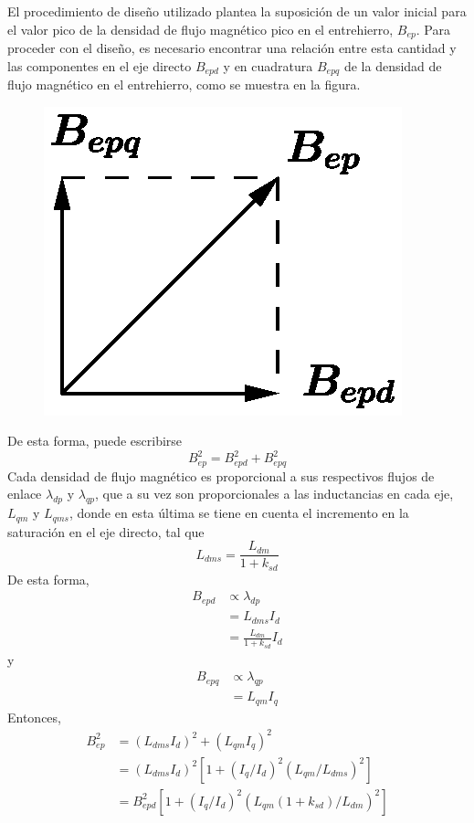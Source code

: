 El procedimiento de diseño utilizado plantea la suposición de un valor inicial para el valor pico de la densidad de flujo magnético pico en el entrehierro, $B_{ep}$. Para proceder con el diseño, es necesario encontrar una relación entre esta cantidad y las componentes en el eje directo $B_{epd}$ y en cuadratura $B_{epq}$ de la densidad de flujo magnético en el entrehierro, como se muestra en la figura.
\begin{figure}
\centering
\includegraphics[scale=0.5]{../img/Teoria_del_MLR/B_decomposition.eps}
\end{figure}
De esta forma, puede escribirse
\begin{equation}
B_{ep}^2 = B_{epd}^2 + B_{epq}^2
\end{equation}
Cada densidad de flujo magnético es proporcional a sus respectivos flujos de enlace $\lambda_{dp}$ y $\lambda_{qp}$, que a su vez son proporcionales a las inductancias en cada eje, $L_{qm}$ y $L_{qms}$, donde en esta última se tiene en cuenta el incremento en la saturación en el eje directo, tal que
\begin{equation}
L_{dms} = \frac{L_{dm}}{1+k_{sd}}
\end{equation}
De esta forma, 
\begin{align*}
B_{epd} &\propto \lambda_{dp} \\
&= L_{dms}I_d\\
&= \frac{L_{dm}}{1+k_{sd}}I_d
\end{align*}
y
\begin{align*}
B_{epq} &\propto \lambda_{qp} \\
&= L_{qm}I_q
\end{align*}
Entonces,
\begin{align*}
B_{ep}^2 &= (L_{dms}I_d)^2 + (L_{qm}I_q)^2\\
&= (L_{dms}I_d)^2\left[1+(I_q/I_d)^2(L_{qm}/L_{dms})^2\right]\\
&= B_{epd}^2\left[1+(I_q/I_d)^2(L_{qm}(1+k_{sd})/L_{dm})^2\right]\\
\end{align*}

